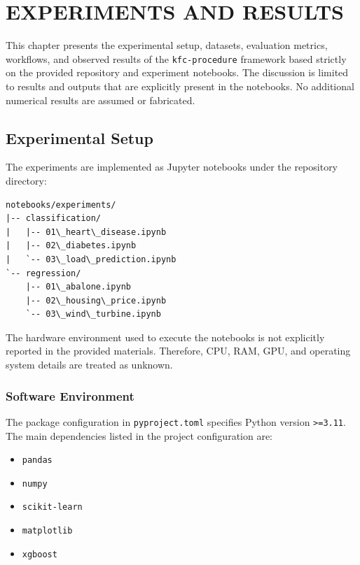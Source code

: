 \chapter{EXPERIMENTS AND RESULTS}
\label{ch:experiments_results}

This chapter presents the experimental setup, datasets, evaluation metrics, workflows, and observed results of the \texttt{kfc-procedure} framework based strictly on the provided repository and experiment notebooks. The discussion is limited to results and outputs that are explicitly present in the notebooks. No additional numerical results are assumed or fabricated.

\section{Experimental Setup}
\label{sec:experimental_setup}

The experiments are implemented as Jupyter notebooks under the repository directory:

\begin{verbatim}
notebooks/experiments/
|-- classification/
|   |-- 01\_heart\_disease.ipynb
|   |-- 02\_diabetes.ipynb
|   `-- 03\_load\_prediction.ipynb
`-- regression/
    |-- 01\_abalone.ipynb
    |-- 02\_housing\_price.ipynb
    `-- 03\_wind\_turbine.ipynb
\end{verbatim}

The hardware environment used to execute the notebooks is not explicitly reported in the provided materials. Therefore, CPU, RAM, GPU, and operating system details are treated as unknown.

\subsection{Software Environment}

The package configuration in \texttt{pyproject.toml} specifies Python version \texttt{>=3.11}. The main dependencies listed in the project configuration are:

\begin{itemize}
    \item \texttt{pandas}
    \item \texttt{numpy}
    \item \texttt{scikit-learn}
    \item \texttt{matplotlib}
    \item \texttt{xgboost}
\end{itemize}

